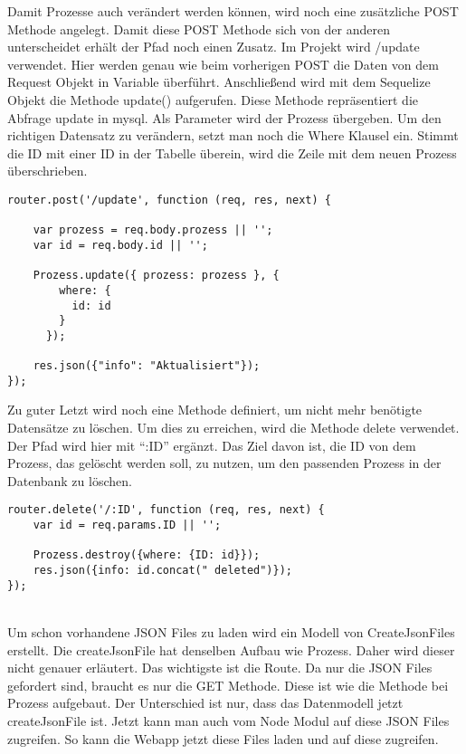\documentclass[a4paper,11pt]{scrreprt}
\begin{document}
Damit Prozesse auch verändert werden können, wird noch eine zusätzliche POST Methode angelegt. Damit diese POST Methode sich von der anderen unterscheidet erhält der Pfad noch einen Zusatz. Im Projekt wird /update verwendet. Hier werden genau wie beim vorherigen POST die Daten von dem Request Objekt in Variable überführt. Anschließend wird mit dem Sequelize Objekt die Methode update() aufgerufen. Diese Methode repräsentiert die Abfrage update in mysql. Als Parameter wird der Prozess übergeben. Um den richtigen Datensatz zu verändern, setzt man noch die Where Klausel ein. Stimmt die ID mit einer ID in der Tabelle überein, wird die Zeile mit dem neuen Prozess überschrieben. 
 \begin{lstlisting}
router.post('/update', function (req, res, next) {

    var prozess = req.body.prozess || '';
    var id = req.body.id || '';

    Prozess.update({ prozess: prozess }, {
        where: {
          id: id
        }
      });
    
    res.json({"info": "Aktualisiert"});
});
\end{lstlisting}

Zu guter Letzt wird noch eine Methode definiert, um nicht mehr benötigte Datensätze zu löschen. Um dies zu erreichen, wird die Methode delete verwendet. Der Pfad wird hier mit “:ID” ergänzt. Das Ziel davon ist, die ID von dem Prozess, das gelöscht werden soll, zu nutzen, um den passenden Prozess in der Datenbank zu löschen.
 \begin{lstlisting}
router.delete('/:ID', function (req, res, next) {
    var id = req.params.ID || '';

    Prozess.destroy({where: {ID: id}});
    res.json({info: id.concat(" deleted")});
});
\end{lstlisting}
\\
Um schon vorhandene JSON Files zu laden wird ein Modell von CreateJsonFiles erstellt. Die createJsonFile hat denselben Aufbau wie Prozess. Daher wird dieser nicht genauer erläutert. Das wichtigste ist die Route. Da nur die JSON Files gefordert sind, braucht es nur die GET Methode. Diese ist wie die Methode bei Prozess aufgebaut. Der Unterschied ist nur, dass das Datenmodell jetzt  createJsonFile ist. 
Jetzt kann man auch vom Node Modul auf diese JSON Files zugreifen.
So kann die Webapp jetzt diese Files laden und auf diese zugreifen.
\end{document}

